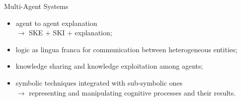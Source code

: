 \documentclass[presentation]{beamer}\mode<presentation>{\usetheme{AMSBolognaFC}}
\begin{document}
\begin{frame}[c]{Multi-Agent Systems}
    \begin{itemize}
        \item agent to agent explanation \\
        $\rightarrow$ SKE + SKI + explanation;
        \item logic as lingua franca for communication between heterogeneous entities;
        \item knowledge sharing and knowledge exploitation among agents;
        \item symbolic techniques integrated with sub-symbolic ones\\
        $\rightarrow$ representing and manipulating cognitive
        processes and their results.
    \end{itemize}
\end{frame}

\section*{}

\frame{\titlepage}

\section*{\refname}

\begin{frame}{\refname}
    \scriptsize
    
    
\end{frame}

\end{document}
